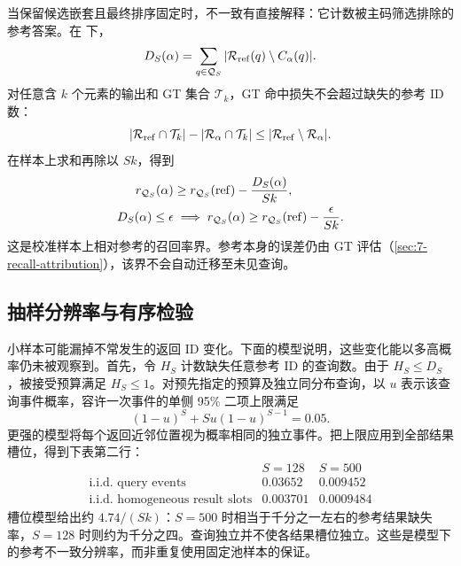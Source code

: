 当保留候选嵌套且最终排序固定时，不一致有直接解释：它计数被主码筛选排除的参考答案。在  下，
\begin{equation}
 D_S(\alpha)=\sum_{q\in\mathcal Q_S}
       |\mathcal R_{\rm ref}(q)\setminus C_\alpha(q)|.
 \label{eq:6-reference-coverage}
\end{equation}
对任意含 $k$ 个元素的输出和 GT 集合 $\mathcal T_k$，GT 命中损失不会超过缺失的参考 ID 数：
\[
 |\mathcal R_{\rm ref}\cap\mathcal T_k|-|\mathcal R_\alpha\cap\mathcal T_k|
 \leq|\mathcal R_{\rm ref}\setminus\mathcal R_\alpha|.
\]
在样本上求和再除以 $Sk$，得到
\begin{equation}
 \begin{aligned}
 r_{\mathcal Q_S}(\alpha)
 &\geq r_{\mathcal Q_S}({\rm ref})-\frac{D_S(\alpha)}{Sk},\\
 D_S(\alpha)\leq\epsilon
 &\implies r_{\mathcal Q_S}(\alpha)
       \geq r_{\mathcal Q_S}({\rm ref})-\frac{\epsilon}{Sk}.
 \end{aligned}
 \label{eq:6-relative-recall}
\end{equation}
这是校准样本上相对参考的召回率界。参考本身的误差仍由 GT 评估（\cref{sec:7-recall-attribution}），该界不会自动迁移至未见查询。

\subsection{抽样分辨率与有序检验}

小样本可能漏掉不常发生的返回 ID 变化。下面的模型说明，这些变化能以多高概率仍未被观察到。首先，令 $H_S$ 计数缺失任意参考 ID 的查询数。由于 $H_S\leq D_S$，被接受预算满足 $H_S\leq1$。对预先指定的预算及独立同分布查询，以 $u$ 表示该查询事件概率，容许一次事件的单侧 95\% 二项上限满足 \cite{nist_binomial}
\begin{equation}
 (1-u)^S+Su(1-u)^{S-1}=0.05.
 \label{eq:6-binomial-limit}
\end{equation}
更强的模型将每个返回近邻位置视为概率相同的独立事件。把上限应用到全部结果槽位，得到下表第二行：
\[
 \begin{array}{c|cc}
 &S=128&S=500\\\hline
 \text{i.i.d. query events}&0.03652&0.009452\\
 \text{i.i.d. homogeneous result slots}&0.003701&0.0009484
 \end{array}
\]
槽位模型给出约 $4.74/(Sk)$：$S=500$ 时相当于千分之一左右的参考结果缺失率，$S=128$ 时则约为千分之四。查询独立并不使各结果槽位独立。这些是模型下的参考不一致分辨率，而非重复使用固定池样本的保证。

